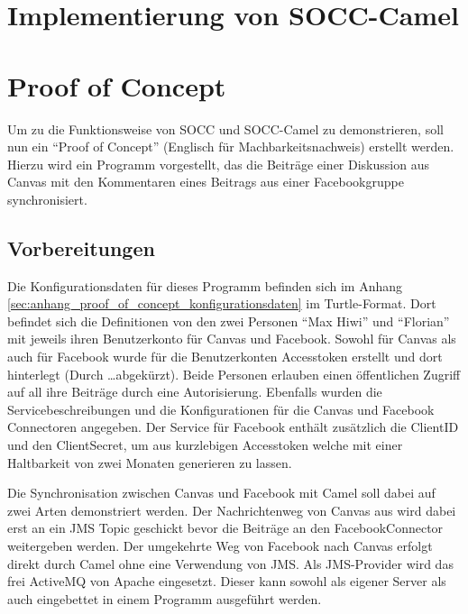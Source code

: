 



\section{Implementierung von SOCC-Camel} %
\label{sec:implementierung_von_socc_camel}




\section{Proof of Concept} %
\label{sec:proof_of_concept}

Um zu die Funktionsweise von SOCC und SOCC-Camel zu demonstrieren, soll nun ein \enquote{Proof of Concept} (Englisch für Machbarkeitsnachweis) erstellt werden. Hierzu wird ein Programm vorgestellt, das die Beiträge einer Diskussion aus Canvas mit den Kommentaren eines Beitrags aus einer  Facebookgruppe synchronisiert. 

\subsection{Vorbereitungen} %
\label{sub:vorbereitungen}

Die Konfigurationsdaten für dieses Programm befinden sich im Anhang \ref{sec:anhang_proof_of_concept_konfigurationsdaten} im Turtle-Format. Dort befindet sich die Definitionen von den zwei Personen \enquote{Max Hiwi} und \enquote{Florian} mit jeweils ihren Benutzerkonto für Canvas und Facebook. Sowohl für Canvas als auch für Facebook wurde für die Benutzerkonten Accesstoken erstellt und dort hinterlegt (Durch \dots abgekürzt). Beide Personen erlauben einen öffentlichen Zugriff auf all ihre Beiträge durch eine Autorisierung. Ebenfalls wurden die Servicebeschreibungen und die Konfigurationen für die Canvas und Facebook Connectoren angegeben. Der Service für Facebook enthält zusätzlich die ClientID und den ClientSecret, um aus kurzlebigen Accesstoken welche mit einer Haltbarkeit von zwei Monaten generieren zu lassen.

Die Synchronisation zwischen Canvas und Facebook mit Camel soll dabei auf zwei Arten demonstriert werden. Der Nachrichtenweg von Canvas aus wird dabei erst an ein JMS Topic geschickt bevor die Beiträge an den FacebookConnector weitergeben werden. Der umgekehrte Weg von Facebook nach Canvas erfolgt direkt durch Camel ohne eine Verwendung von JMS. Als JMS-Provider wird das frei ActiveMQ von Apache eingesetzt. Dieser kann sowohl als eigener Server als auch eingebettet in einem Programm ausgeführt werden.

